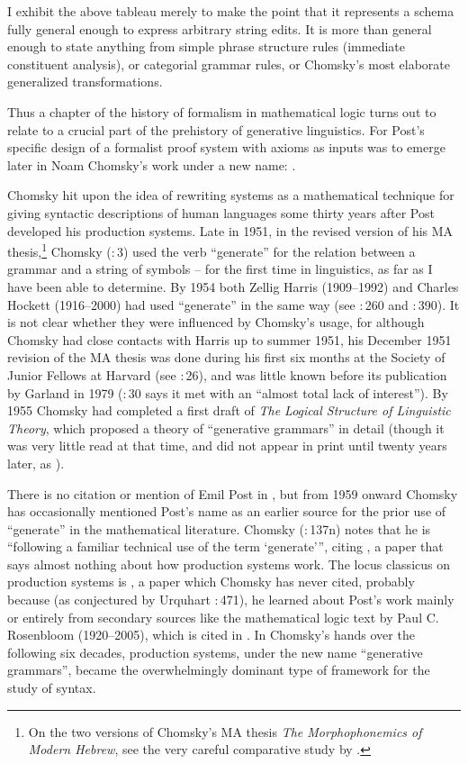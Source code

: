 \documentclass[output=paper]{langscibook}
\begin{document}
I exhibit the above tableau merely to make the point that it represents a schema fully general enough to express arbitrary string edits. It is more than general enough to state anything from simple phrase structure rules (immediate constituent analysis), or categorial grammar rules, or Chomsky's most elaborate generalized transformations.

Thus a chapter of the history of formalism in mathematical logic turns out to relate to a crucial part of the prehistory of generative linguistics. For Post's specific design of a formalist proof system with axioms as inputs was to emerge later in Noam Chomsky's work under a new name: .

Chomsky hit upon the idea of rewriting systems as a mathematical technique for giving syntactic descriptions of human languages some thirty years after Post developed his production systems.  Late in 1951, in the revised version of his MA thesis,\footnote{On the two versions of Chomsky's MA thesis \textit{The Morphophonemics of Modern Hebrew}, see the very careful comparative study by \citet{Daniels10}.} Chomsky (\citeyear{Chomsky51b}:\,3) used the verb ``generate'' for the relation between a grammar and a string of symbols -- for the first time in linguistics, as far as I have been able to determine.  By 1954 both Zellig Harris (1909--1992) and Charles Hockett (1916--2000) had used ``generate'' in the same way (see \citealt{Harris54transfer}:\,260 and \citealt{Hockett54}:\,390). It is not clear whether they were influenced by Chomsky's usage, for although Chomsky had close contacts with Harris up to summer 1951, his December 1951 revision of the MA thesis was done during his first six months at the Society of Junior Fellows at Harvard (see \citealt{Chomsky75LSLT}:\,26), and was little known before its publication by Garland in 1979 (\citealt{Chomsky75LSLT}:\,30 says it met with an ``almost total lack of interest''). By 1955 \nocite{Chomsky55LSLT} Chomsky had completed a first draft of \textit{The Logical Structure of Linguistic Theory}, which proposed a theory of ``generative grammars'' in detail (though it was very little read at that time, and did not appear in print until twenty years later, as \citealt{Chomsky75LSLT}).

There is no citation or mention of Emil Post in \citet{Chomsky55LSLT}, but from 1959 onward Chomsky has occasionally mentioned Post's name as an earlier source for the prior use of ``generate'' in the mathematical literature. Chomsky (\citeyear{Chomsky59CFPG}:\,137n) notes that he is ``following a familiar technical use of the term `generate'\thinspace'', citing \citet{Post44}, a paper that says almost nothing about how production systems work. The locus classicus on production systems is \citet{Post43}, a paper which Chomsky has never cited, probably because (as conjectured by Urquhart \citeyear{Urquhart09}:\,471), he learned about Post's work mainly or entirely from secondary sources like the \citeyear{Rosenbloom50} mathematical logic text by Paul C. Rosenbloom (1920--2005), which is cited in \citet{Chomsky75LSLT}. In Chomsky's hands over the following six decades, production systems, under the new name ``generative grammars'', became the overwhelmingly dominant type of framework for the study of syntax.
\end{document}
